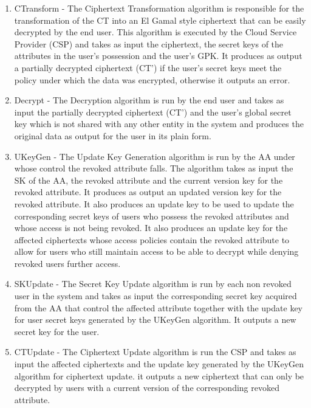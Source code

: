 \begin{enumerate}[label=(\arabic*)]
	\item CTransform - The Ciphertext Transformation algorithm is responsible for the transformation of the CT into an El Gamal style ciphertext that can be easily decrypted by the end user. This algorithm is executed by the Cloud Service Provider (CSP) and takes as input the ciphertext, the secret keys of the attributes in the user's possession and the user's GPK. It produces as output a partially decrypted ciphertext (CT') if the user's secret keys meet the policy under which the data was encrypted, otherwise it outputs an error.
	
	\item Decrypt - The Decryption algorithm is run by the end user and takes as input the partially decrypted ciphertext (CT') and the user's global secret key which is not shared with any other entity in the system and produces the original data as output for the user in its plain form.
	
	\item UKeyGen - The Update Key Generation algorithm is run by the AA under whose control the revoked attribute falls. The algorithm takes as input the SK of the AA, the revoked attribute and the current version key for the revoked attribute. It produces as output an updated version key for the revoked attribute. It also produces an update key to be used to update the corresponding secret keys of users who possess the revoked attributes and whose access is not being revoked. It also produces an update key for the affected ciphertexts whose access policies contain the revoked attribute to allow for users who still maintain access to be able to decrypt while denying revoked users further access.
	
	\item SKUpdate - The Secret Key Update algorithm is run by each non revoked user in the system and takes as input the corresponding secret key acquired from the AA that control the affected attribute together with the update key for user secret keys generated by the UKeyGen algorithm. It outputs a new secret key for the user.
	
	\item CTUpdate - The Ciphertext Update algorithm is run the CSP and takes as input the affected ciphertexts and the update key generated by the UKeyGen algorithm for ciphertext update. it outputs a new ciphertext that can only be decrypted by users with a current version of the corresponding revoked attribute.
	
\end{enumerate}

